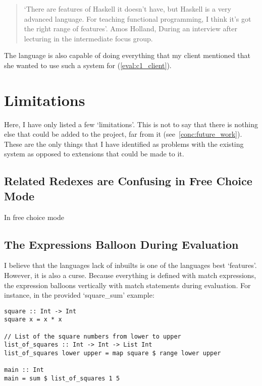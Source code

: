 \begin{quotation}
\noindent `There are features of Haskell it doesn't have, but Haskell is a very advanced language. For teaching functional programming, I think it's got the right range of features'. Amos Holland, During an interview after lecturing in the intermediate focus group.
\end{quotation}

\noindent The language is also capable of doing everything that my client mentioned that she wanted to use such a system for (\ref{eval:c1_client}).


\section{Limitations}
Here, I have only listed a few `limitations'. This is not to say that there is nothing else that could be added to the project, far from it (see~\ref{conc:future_work}). These are the only things that I have identified as problems with the existing system as opposed to extensions that could be made to it. 

\subsection{Related Redexes are Confusing in Free Choice Mode}
In free choice mode 

\subsection{The Expressions Balloon During Evaluation}
\label{conc:baboon}
I believe that the languages lack of inbuilts is one of the languages best `features'. However, it is also a curse. Because everything is defined with match expressions, the expression balloons vertically with match statements during evaluation. For instance, in the provided `square\_sum' example:

\begin{lstlisting}[language=SFL]
square :: Int -> Int
square x = x * x

// List of the square numbers from lower to upper
list_of_squares :: Int -> Int -> List Int
list_of_squares lower upper = map square $ range lower upper

main :: Int
main = sum $ list_of_squares 1 5
\end{lstlisting}


